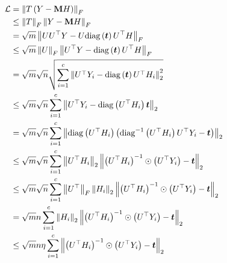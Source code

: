 \documentclass{article} %
\begin{document}


\begin{equation}
	\begin{aligned}
		{\mathcal{L}}&=\left\|T\left(Y-{\mathbf{M}} H\right)\right\|_F\\
		&\leq\left\|T\right\|_F\left\|Y-{\mathbf{M}} H\right\|_F\\
		&=\sqrt{m}\left\|UU^{\top}Y-U\mathrm{diag}\left({\bm{t}}\right)U^{\top}H\right\|_F\\
		&\leq\sqrt{m}\left\|U\right\|_F\left\|U^{\top}Y-\mathrm{diag}\left({\bm{t}}\right)U^{\top}H\right\|_F\\
		&=\sqrt{m}\sqrt{n}\sqrt{\sum_{i=1}^c\left\|U^{\top}Y_i-\mathrm{diag}\left({\bm{t}}\right)U^{\top}H_i\right\|^2_2}\\
		&\leq\sqrt{m}\sqrt{n}\sum_{i=1}^c\left\|U^{\top}Y_i-\mathrm{diag}\left(U^{\top}H_i\right){\bm{t}}\right\|_2\\
		&=\sqrt{m}\sqrt{n}\sum_{i=1}^c\left\|\mathrm{diag}\left(U^{\top}H_i\right)\left(\mathrm{diag}^{-1}\left(U^{\top}H_i\right)U^{\top}Y_i-{\bm{t}}\right)\right\|_2\\
		&\leq\sqrt{m}\sqrt{n}\sum_{i=1}^c\left\|U^{\top}H_i\right\|_2\left\|\left(U^{\top}H_i\right)^{-1}\odot\left(U^{\top}Y_i\right)-{\bm{t}}\right\|_2\\
		&\leq\sqrt{m}\sqrt{n}\sum_{i=1}^c\left\|U^{\top}\right\|_F\left\|H_i\right\|_2\left\|\left(U^{\top}H_i\right)^{-1}\odot\left(U^{\top}Y_i\right)-{\bm{t}}\right\|_2\\
		&=\sqrt{m}n\sum_{i=1}^c\left\|H_i\right\|_2\left\|\left(U^{\top}H_i\right)^{-1}\odot\left(U^{\top}Y_i\right)-{\bm{t}}\right\|_2\\
		&\leq\sqrt{m}n\eta\sum_{i=1}^c\left\|\left(U^{\top}H_i\right)^{-1}\odot\left(U^{\top}Y_i\right)-{\bm{t}}\right\|_2
	\end{aligned}
\end{equation}
\end{document}
